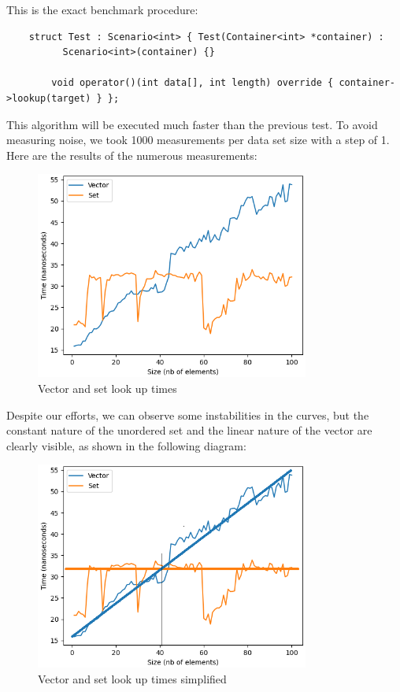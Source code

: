 \documentclass[conference]{IEEEtran} \IEEEoverridecommandlockouts \usepackage{graphicx}
\begin{document}
This is the exact benchmark procedure:
\begin{lstlisting}
	struct Test : Scenario<int> { Test(Container<int> *container) :
          Scenario<int>(container) {}
		
		void operator()(int data[], int length) override { container->lookup(target) } };
\end{lstlisting}


This algorithm will be executed much faster than the previous test.  To avoid measuring
noise, we took 1000 measurements per data set size with a step of 1. Here are the results
of the numerous measurements:
\begin{figure}[!h]
	\includegraphics[width=9cm]{Diagram/lookup.png}
	\caption{Vector and set look up times}
	\label{vector vs set lookup}
\end{figure}

Despite our efforts, we can observe some instabilities in the curves, but the constant
nature of the unordered set and the linear nature of the vector are clearly visible, as
shown in the following diagram:
\begin{figure}[!h]
	\includegraphics[width=9cm]{Diagram/lookup_courbe.png}
	\caption{Vector and set look up times simplified}
	\label{vector vs set lookup curve}
\end{figure}
\end{document}

